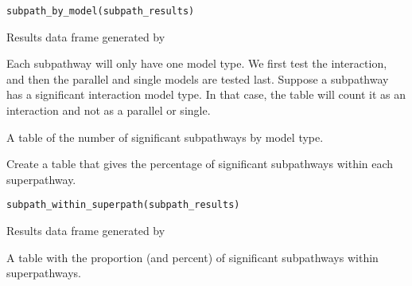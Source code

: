 \documentclass[a4paper]{book}
\begin{document}
%
\begin{Usage}
\begin{verbatim}
subpath_by_model(subpath_results)
\end{verbatim}
\end{Usage}
%
\begin{Arguments}
\begin{ldescription}
\item[\code{subpath\_results}] Results data frame generated by 
\end{ldescription}
\end{Arguments}
%
\begin{Details}
Each subpathway will only have one model type. We first test the interaction,
and then the parallel and single models are tested last. Suppose a subpathway
has a significant interaction model type. In that case, the table will count
it as an interaction and not as a parallel or single.
\end{Details}
%
\begin{Value}
A table of the number of significant subpathways by model type.
\end{Value}
%
\begin{Description}
Create a table that gives the percentage of significant subpathways within each
superpathway.
\end{Description}
%
\begin{Usage}
\begin{verbatim}
subpath_within_superpath(subpath_results)
\end{verbatim}
\end{Usage}
%
\begin{Arguments}
\begin{ldescription}
\item[\code{subpath\_results}] Results data frame generated by 
\end{ldescription}
\end{Arguments}
%
\begin{Value}
A table with the proportion (and percent) of significant subpathways within superpathways.
\end{Value}
\printindex{}
\end{document}
